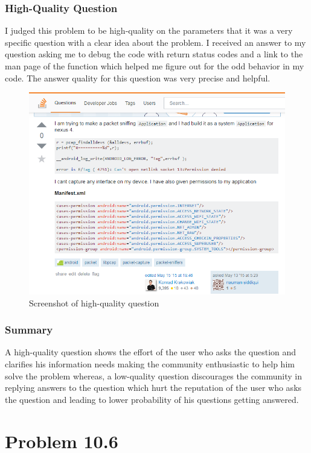 \documentclass[12pt]{report}
\begin{document}
\subsection{High-Quality Question}
I judged this problem to be high-quality on the parameters that it was a very specific question with a clear idea about the problem. I received an answer to my question asking me to debug the code with return status codes and a link to the man page of the function which helped me figure out for the odd behavior in my code. The answer quality for this question was very precise and helpful.   
\begin{figure}[ht]
  \centering
  \includegraphics[width=1\textwidth]{Problem10_5/HighQuality.png}
  \caption{Screenshot of high-quality question}
  \label{fig:1}
\end{figure} 

\subsection{Summary}
A high-quality question shows the effort of the user who asks the question and clarifies his information needs making the community enthusiastic to help him solve the problem whereas, a low-quality question discourages the community in replying answers to the question which hurt the reputation of the user who asks the question and leading to lower probability of his questions getting answered. 

\chapter{Problem 10.6}
\end{document}
